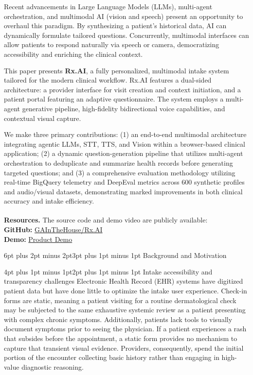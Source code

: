\documentclass[sigplan,screen]{acmart}
\makeatletter
\renewcommand{\section}{\@startsection{section}{1}{\z@}
  {6pt plus 2pt minus 2pt}{3pt plus 1pt minus 1pt}
  {\normalfont\large\bfseries}}
\renewcommand{\subsection}{\@startsection{subsection}{2}{\z@}
  {4pt plus 1pt minus 1pt}{2pt plus 1pt minus 1pt}
  {\normalfont\normalsize\bfseries}}
\makeatother
\begin{document}
Recent advancements in Large Language Models (LLMs), multi-agent orchestration, and multimodal AI (vision and speech) present an opportunity to overhaul this paradigm. By synthesizing a patient's historical data, AI can dynamically formulate tailored questions. Concurrently, multimodal interfaces can allow patients to respond naturally via speech or camera, democratizing accessibility and enriching the clinical context. 

This paper presents \textbf{Rx.AI}, a fully personalized, multimodal intake system tailored for the modern clinical workflow. Rx.AI features a dual-sided architecture: a provider interface for visit creation and context initiation, and a patient portal featuring an adaptive questionnaire. The system employs a multi-agent generative pipeline, high-fidelity bidirectional voice capabilities, and contextual visual capture. 

We make three primary contributions: (1) an end-to-end multimodal architecture integrating agentic LLMs, STT, TTS, and Vision within a browser-based clinical application; (2) a dynamic question-generation pipeline that utilizes multi-agent orchestration to deduplicate and summarize health records before generating targeted questions; and (3) a comprehensive evaluation methodology utilizing real-time BigQuery telemetry and DeepEval metrics across 600 synthetic profiles and audio/visual datasets, demonstrating marked improvements in both clinical accuracy and intake efficiency.\\ \\

\noindent\textbf{Resources.} The source code and demo video are publicly available:\\
\textbf{GitHub:} \href{https://github.com/GAInTheHouse/rx-ai}{GAInTheHouse/Rx.AI}\\
\textbf{Demo:} \href{https://github.com/GAInTheHouse/rx-ai/blob/main/submissions/rx_ai_demo_video.mov}{Product Demo}

\section{Background and Motivation}

\subsection{Intake accessibility and transparency challenges}
Electronic Health Record (EHR) systems have digitized patient data but have done little to optimize the intake user experience. Check-in forms are static, meaning a patient visiting for a routine dermatological check may be subjected to the same exhaustive systemic review as a patient presenting with complex chronic symptoms. Additionally, patients lack tools to visually document symptoms prior to seeing the physician. If a patient experiences a rash that subsides before the appointment, a static form provides no mechanism to capture that transient visual evidence. Providers, consequently, spend the initial portion of the encounter collecting basic history rather than engaging in high-value diagnostic reasoning.
\end{document}
